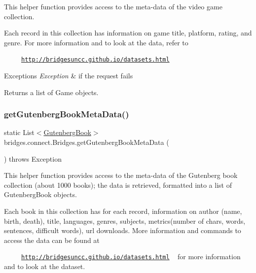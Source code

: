 This helper function provides access to the meta-\/data of the video game collection.

Each record in this collection has information on game title, platform, rating, and genre. For more information and to look at the data, refer to 

~~~~~\href{http://bridgesuncc.github.io/datasets.html}{\tt http\+://bridgesuncc.\+github.\+io/datasets.\+html} 


\begin{DoxyExceptions}{Exceptions}
{\em Exception} & if the request fails\\
\hline
\end{DoxyExceptions}
\begin{DoxyReturn}{Returns}
a list of Game objects. 
\end{DoxyReturn}
\mbox{\label{classbridges_1_1connect_1_1_bridges_a7847b5a45cae8491acd5b6fb0015415b}} 
\subsubsection{\texorpdfstring{get\+Gutenberg\+Book\+Meta\+Data()}{getGutenbergBookMetaData()}}
{\footnotesize\ttfamily static List$<$\mbox{\hyperlink{classbridges_1_1data__src__dependent_1_1_gutenberg_book}{Gutenberg\+Book}}$>$ bridges.\+connect.\+Bridges.\+get\+Gutenberg\+Book\+Meta\+Data (\begin{DoxyParamCaption}{ }\end{DoxyParamCaption}) throws Exception\hspace{0.3cm}{\ttfamily [static]}}

This helper function provides access to the meta-\/data of the Gutenberg book collection (about 1000 books); the data is retrieved, formatted into a list of Gutenberg\+Book objects.

Each book in this collection has for each record, information on author (name, birth, death), title, languages, genres, subjects, metrics(number of chars, words, sentences, difficult words), url downloads. More information and commands to access the data can be found at 

~~~~~\href{http://bridgesuncc.github.io/datasets.html}{\tt http\+://bridgesuncc.\+github.\+io/datasets.\+html} ~\newline
 for more information and to look at the dataset.


